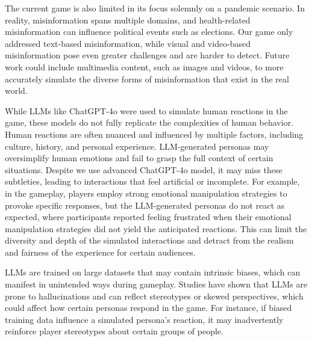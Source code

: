 The current game is also limited in its focus solemnly on a pandemic scenario. In reality, misinformation spans multiple domains, and health-related misinformation  can influence political events such as elections. Our game only addressed text-based misinformation, while visual and video-based misinformation pose even greater challenges and are harder to detect. Future work could include  multimedia content, such as images and videos, to more accurately simulate the diverse forms of misinformation that exist in the real world.

While LLMs like ChatGPT-4o were used to simulate human reactions in the game, these models do not fully replicate the complexities of human behavior. Human reactions are often nuanced and influenced by multiple factors, including culture, history, and personal experience. LLM-generated personas may oversimplify human emotions and fail to grasp the full context of certain situations. Despite we use advanced ChatGPT-4o model, it may miss these subtleties, leading to interactions that feel artificial or incomplete. For example, in the gameplay, players employ strong emotional manipulation strategies to provoke specific responses, but the LLM-generated personas do not react as expected, where participants reported feeling frustrated when their emotional manipulation strategies did not yield the anticipated reactions. This can limit the diversity and depth of the simulated interactions and detract from the realism and fairness of the experience for certain audiences.

LLMs are trained on large datasets that may contain intrinsic biases, which can manifest in unintended ways during gameplay\cite{kasneci2023chatgpt}. Studies have shown that LLMs are prone to hallucinations and can reflect stereotypes or skewed perspectives, which could affect how certain personas respond in the game\cite{xie2024can}. For instance, if biased training data influence a simulated persona’s reaction, it may inadvertently reinforce player stereotypes about certain groups of people. 




